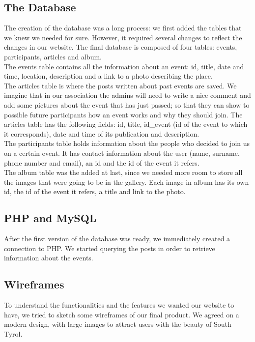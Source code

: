 \documentclass[a4paper]{article}
\begin{document}
	\subsection{The Database}
	The creation of the database was a long process: we first added the tables that we knew we needed for sure. However, it required several changes to reflect the changes in our website. The final database is composed of four tables: events, participants, articles and album.\\
	The events table contains all the information about an event: id, title, date and time, location, description and a link to a photo describing the place.\\
	The articles table is where the posts written about past events are saved. We imagine that in our association the admins will need to write a nice comment and add some pictures about the event that has just passed; so that they can show to possible future participants how an event works and why they should join. The articles table has the following fields: id, title, id\_event (id of the event to which it corresponds), date and time of its publication and description.\\
	The participants table holds information about the people who decided to join us on a certain event. It has contact information about the user (name, surname, phone number and email), an id and the id of the event it refers.\\
	The album table was the added at last, since we needed more room to store all the images that were going to be in the gallery. Each image in album has its own id, the id of the event it refers, a title and link to the photo.
	
	\subsection{PHP and MySQL}
	After the first version of the database was ready, we immediately created a connection to PHP. We started querying the posts in order to retrieve information about the events.
	
	\subsection{Wireframes}
	To understand the functionalities and the features we wanted our website to have, we tried to sketch some wireframes of our final product. We agreed on a modern design, with large images to attract users with the beauty of South Tyrol. 
	
\end{document}
